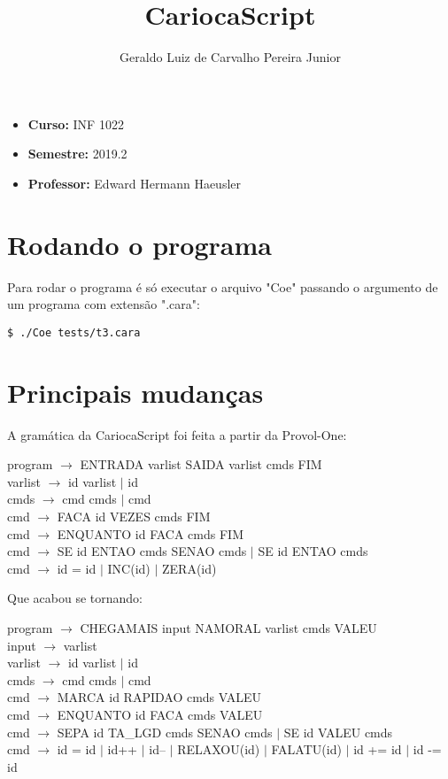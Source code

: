 \documentclass{article}
\title{\vspace{-2cm}CariocaScript}
\author{Geraldo Luiz de Carvalho Pereira Junior}
\date{}
\begin{document}
\maketitle


\begin{itemize}
	\item{\textbf{Curso:} INF 1022}
	\item{\textbf{Semestre:} 2019.2}
	\item{\textbf{Professor:} Edward Hermann Haeusler}
\end{itemize}

\section{Rodando o programa}

Para rodar o programa é só executar o arquivo "Coe" passando o argumento de um programa com extensão ".cara":

\begin{lstlisting}
$ ./Coe tests/t3.cara
\end{lstlisting}

\section{Principais mudanças}

A gramática da CariocaScript foi feita a partir da Provol-One:

\bigskip
\noindent
program $\to$ ENTRADA varlist SAIDA varlist cmds FIM\\
varlist $\to$ id varlist $|$ id\\
cmds $\to$ cmd cmds $|$ cmd\\
cmd $\to$ FACA id VEZES cmds FIM\\
cmd $\to$ ENQUANTO id FACA cmds FIM\\
cmd $\to$ SE id ENTAO cmds SENAO cmds $|$ SE id ENTAO cmds\\
cmd $\to$ id = id $|$ INC(id) $|$ ZERA(id)

\bigskip
\noindent
Que acabou se tornando:

\bigskip
\noindent
program $\to$ CHEGAMAIS input NAMORAL varlist cmds VALEU\\
input $\to$ varlist\\
varlist $\to$ id varlist $|$ id\\
cmds $\to$ cmd cmds $|$ cmd\\
cmd $\to$ MARCA id RAPIDAO cmds VALEU\\
cmd $\to$ ENQUANTO id FACA cmds VALEU\\
cmd $\to$ SEPA id TA_LGD cmds SENAO cmds $|$ SE id VALEU cmds\\
cmd $\to$ id = id $|$ id++ $|$ id-- $|$ RELAXOU(id) $|$ FALATU(id) $|$ id += id $|$ id -= id
\end{document}
